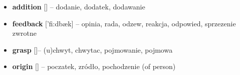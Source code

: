 \documentclass[a4paper,11pt]{article}
\begin{document}
\begin{itemize}
	\item 	\textbf{addition} [] – dodanie, dodatek, dodawanie
	\item\textbf{feedback} [’fi:dbæk] – opinia, rada, odzew, reakcja, odpowied, sprzezenie 	zwrotne
	\item \textbf{grasp }[]– (u)chwyt, chwytac, pojmowanie, pojmowa 
	\item\textbf{origin} [] – poczatek, zródło, pochodzenie (of person)

\end{itemize}


\end{document}
